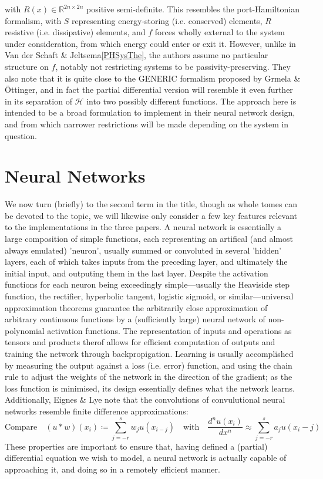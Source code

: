 \documentclass[10 pt, a4paper]{article}
\begin{document}
with $R(x)\in\mathbb{R}^{2n\times 2n}$ positive semi-definite. This resembles the port-Hamiltonian formalism, with $S$ representing energy-storing (i.e. conserved) elements, $R$ resistive (i.e. dissipative) elements, and $f$ forces wholly external to the system under consideration, from which energy could enter or exit it. However, unlike in Van der Schaft \& Jeltsema\ref{PHSysThe}, the authors assume no particular structure on $f$, notably not restricting systems to be passivity-preserving. They also note that it is quite close to the GENERIC formalism proposed by Grmela \& Öttinger, and in fact the partial differential version will resemble it even further in its separation of $\mathcal{H}$ into two possibly different functions. The approach here is intended to be a broad formulation to implement in their neural network design, and from which narrower restrictions will be made depending on the system in question. \cite{phnn}
\section{Neural Networks}
We now turn (briefly) to the second term in the title, though as whole tomes can be devoted to the topic, we will likewise only consider a few key features relevant to the implementations in the three papers. A neural network is essentially a large composition of simple functions, each representing an artifical (and almost always emulated) 'neuron', usually summed or convoluted in several 'hidden' layers, each of which takes inputs from the preceding layer, and ultimately the initial input, and outputing them in the last layer. Despite the activation functions for each neuron being exceedingly simple—usually the Heaviside step function, the rectifier, hyperbolic tangent, logistic sigmoid, or similar—universal approximation theorems guarantee the arbitrarily close approximation of arbitrary continuous functions by a (sufficiently large) neural network of non-polynomial activation functions. The representation of inputs and operations as tensors and products therof allows for efficient computation of outputs and training the network through backpropigation. Learning is usually accomplished by measuring the output against a loss (i.e. error) function, and using the chain rule to adjust the weights of the network in the direction of the gradient; as the loss function is minimised, its design essentially defines what the network learns. Additionally, Eignes \& Lye note that the convolutions of convulutional neural networks resemble finite difference approximations:
\[\text{Compare}\quad (u*w)(x_i) \coloneqq \sum\limits_{j=-r}^s w_j u(x_{i-j}) \quad\text{with}\quad \frac{d^n u(x_i)}{dx^n} \approx \sum\limits_{j=-r}^s a_j u(x_i-j)\]
These properties are important to ensure that, having defined a (partial) differential equation we wish to model, a neural network is actually capable of approaching it, and doing so in a remotely efficient manner.
\end{document}
